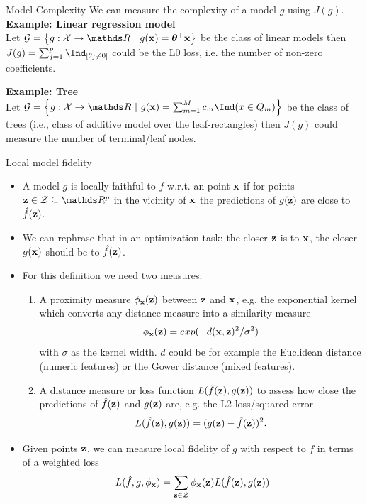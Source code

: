 \documentclass[11pt,compress,t,notes=noshow, xcolor=table]{beamer}
\begin{document}
\begin{vbframe}{Model Complexity}
We can measure the complexity of a model $g$ using $J(g)$. \\ 
\vspace{0.5cm}
 	\textbf{Example: Linear regression model}\\
 	Let $\Gspace = \left\{g: \Xspace \to \R ~|~g(\xv) = \thetab^\top \xv\right\}$ be the class of linear models then $J(g) = \sum_{j = 1}^p \Ind_{[\theta_j \neq 0]}$ could be the L0 loss, i.e. the number of non-zero coefficients. 
 	\vspace{0.5cm}
 	
 	\textbf{Example: Tree}\\
 	Let $\Gspace = \left\{g:\Xspace \to \R ~|~g(\xv) = \sum_{m=1}^M c_m \Ind(x \in Q_m)\right\}$ be the class of trees (i.e., class of additive model over the leaf-rectangles) then $J(g)$ could measure the number of terminal/leaf nodes.\\
 	\end{vbframe}
 
 	\begin{vbframe}{Local model fidelity}
 		\begin{itemize}
 			\item A model $g$ is locally faithful to $f$ w.r.t. an point $\xv$ if for points $\zv \in \Zspace \subseteq \R^p$ in the vicinity of $\xv$ the predictions of $g(\zv)$ are close to $\fh(\zv)$. 
 			 \item We can rephrase that in an optimization task: the closer $\zv$ is to $\xv$, the closer $g(\xv)$ should be to $\fh(\zv)$.  
 			\item For this definition we need two measures:
 			\begin{enumerate}
 				\item A proximity measure $\neigh(\zv)$ between $\zv$ and $\xv$, e.g. the exponential kernel which converts any distance measure into a similarity measure 
 				$$\neigh(\zv) = exp(-d(\xv, \zv)^2/\sigma^2)$$ 
 				with $\sigma$ as the kernel width. $d$ could be for example the Euclidean distance (numeric features) or the Gower distance (mixed features). 
 				\item A distance measure or loss function $L(\fh(\zv), g(\zv))$ to assess how close the predictions of $\fh(\zv)$ and $g(\zv)$ are, e.g. the L2 loss/squared error $$L(\fh(\zv), g(\zv)) = (g(\zv) - \fh(\zv))^2.$$ 
 			\end{enumerate}
 			\item Given points $\zv$, we can measure local fidelity of $g$ with respect to $f$ in terms of a weighted loss
 			\begin{equation}
 				L(\fh, g, \neigh) = \sum_{\zv \in \Zspace} \neigh(\zv) L(\fh(\zv), g(\zv))
 				\label{eq:optim}
 			\end{equation}
 			
 		\end{itemize}
\end{vbframe}
\end{document}
